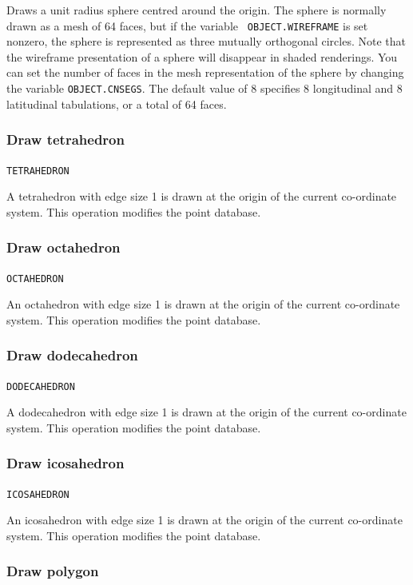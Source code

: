 \documentclass{article}
\begin{document}
Draws a unit radius sphere centred around the origin.  The sphere is
normally drawn as a mesh of 64 faces, but if the variable {\tt
OBJECT.WIREFRAME} is set nonzero, the sphere is represented as
three mutually orthogonal circles.  Note that the wireframe
presentation of a sphere will disappear in shaded renderings.
You can set the number of faces in the mesh representation of the
sphere by changing the variable {\tt OBJECT.CNSEGS}\@.  The default
value of 8 specifies 8 longitudinal and 8 latitudinal tabulations, or a
total of 64 faces.

\subsubsection{Draw tetrahedron}

{\tt TETRAHEDRON}

A tetrahedron with edge size 1 is drawn at the origin of the current
co-ordinate system.  This operation modifies the point database.

\subsubsection{Draw octahedron}

{\tt OCTAHEDRON}

An octahedron with edge size 1 is drawn at the origin of the current
co-ordinate system.  This operation modifies the point database.

\subsubsection{Draw dodecahedron}

{\tt DODECAHEDRON}

A dodecahedron with edge size 1 is drawn at the origin of the current
co-ordinate system.  This operation modifies the point database.

\subsubsection{Draw icosahedron}

{\tt ICOSAHEDRON}

An icosahedron with edge size 1 is drawn at the origin of the current
co-ordinate system.  This operation modifies the point database.

\subsubsection{Draw polygon}
\end{document}
